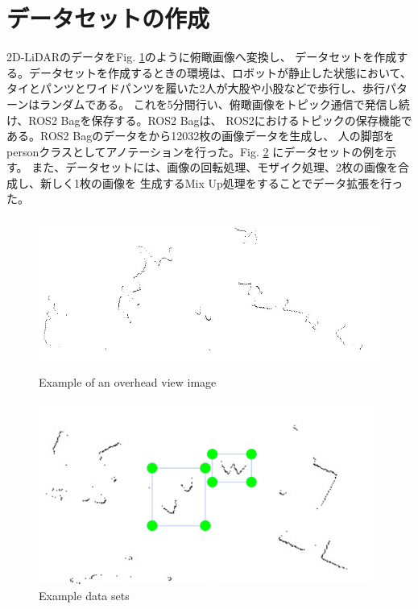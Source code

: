 \section{データセットの作成}
2D-LiDARのデータをFig. \ref{Example of an overhead view image}のように俯瞰画像へ変換し、
データセットを作成する。データセットを作成するときの環境は、ロボットが静止した状態において、
タイとパンツとワイドパンツを履いた2人が大股や小股などで歩行し、歩行パターンはランダムである。
これを5分間行い、俯瞰画像をトピック通信で発信し続け、ROS2 Bagを保存する。ROS2 Bagは、
ROS2におけるトピックの保存機能である。ROS2 Bagのデータをから12032枚の画像データを生成し、
人の脚部をpersonクラスとしてアノテーションを行った。Fig. \ref{Example data sets}
にデータセットの例を示す。
また、データセットには、画像の回転処理、モザイク処理、2枚の画像を合成し、新しく1枚の画像を
生成するMix Up処理をすることでデータ拡張を行った。

\begin{figure}[h]
    \begin{center}
    \includegraphics[height=50mm,clip]{figure/laser_img_232.jpg}
    \caption{Example of an overhead view image}
    \label{Example of an overhead view image}
    \end{center}
\end{figure}

\begin{figure}[h]
    \begin{center}
    \includegraphics[height=60mm,clip]{figure/Example-data-sets.png}
    \caption{Example data sets}
    \label{Example data sets}
    \end{center}
\end{figure}

